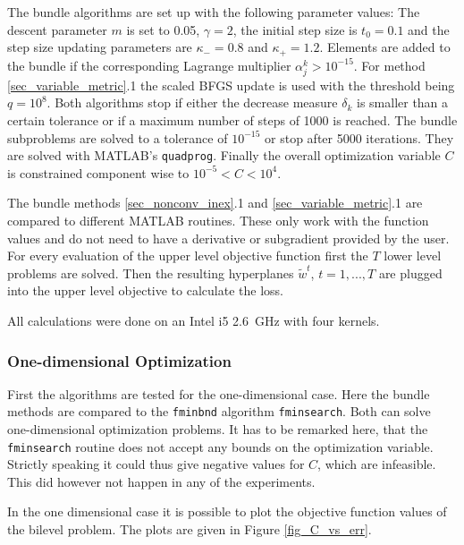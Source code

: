 The bundle algorithms are set up with the following parameter values: The descent parameter \(m\) is set to 0.05, \(\gamma = 2\), the initial step size is \(t_0 = 0.1\) and the step size updating parameters are \(\kappa_{-} = 0.8\) and \(\kappa_{+}=1.2\).
Elements are added to the bundle if the corresponding Lagrange multiplier \(\alpha^k_j > 10^{-15}\).
For method \ref{sec_variable_metric}.1 the scaled BFGS update is used with the threshold being \(q=10^8\).
Both algorithms stop if either the decrease measure \(\delta_k\) is smaller than a certain tolerance or if a maximum number of steps of 1000 is reached. The bundle subproblems are solved to a tolerance of \(10^{-15}\) or stop after 5000 iterations. They are solved with MATLAB's \texttt{quadprog}.
Finally the overall optimization variable \(C\) is constrained component wise to \(10^{-5} < C < 10^4\).


The bundle methods \ref{sec_nonconv_inex}.1 and \ref{sec_variable_metric}.1 are compared to different MATLAB routines.
These only work with the function values and do not need to have a derivative or subgradient provided by the user.
For every evaluation of the upper level objective function first the \(T\) lower level problems are solved. Then the resulting hyperplanes \(\tilde{w}^t\), \(t=1,...,T\) are plugged into the upper level objective to calculate the loss.

All calculations were done on an Intel i5 2.6~GHz with four kernels.


\subsubsection{One-dimensional Optimization}

First the algorithms are tested for the one-dimensional case.
Here the bundle methods are compared to the \texttt{fminbnd} algorithm \texttt{fminsearch}. Both can solve one-dimensional optimization problems.
It has to be remarked here, that the \texttt{fminsearch} routine does not accept any bounds on the optimization variable. Strictly speaking it could thus give negative values for \(C\), which are infeasible. This did however not happen in any of the experiments.

In the one dimensional case it is possible to plot the objective function values of the bilevel problem. The plots are given in Figure \ref{fig_C_vs_err}.

